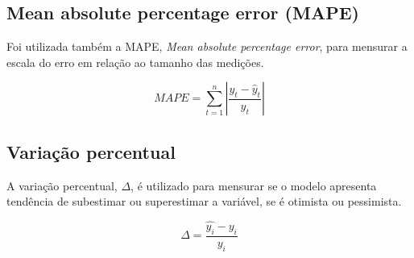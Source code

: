 \subsection{Mean absolute percentage error (MAPE)}

    Foi utilizada também a MAPE, \textit{Mean absolute
    percentage error}, para mensurar a escala do erro em 
    relação ao tamanho das medições.

    \begin{equation}
        MAPE=\sum_{t=1}^n\left|\frac{y_t-\hat{y}_t}{y_t}\right|
    \end{equation}

\subsection{Variação percentual}

A variação percentual, $\Delta$, é utilizado para mensurar se o 
modelo apresenta tendência de subestimar ou superestimar a variável, se 
é otimista ou pessimista.

\begin{equation}
    \Delta = \frac{\hat{y_i} - y_i}{y_i}
\end{equation}

